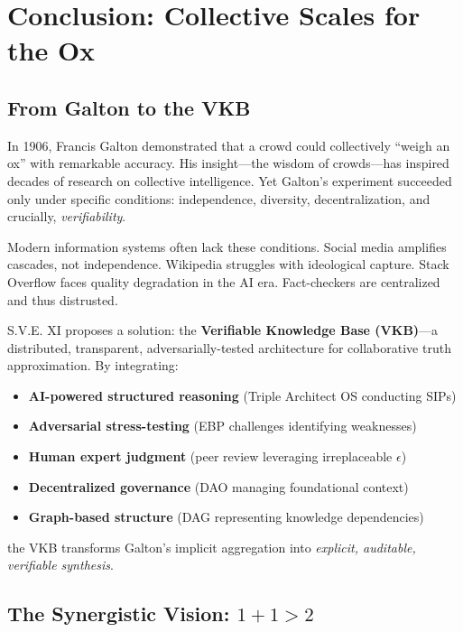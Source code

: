 \documentclass[11pt,a4paper]{article}
\theoremstyle{definition}
\theoremstyle{remark}
\newcommand{\VKB}{\textsc{VKB}}
\newcommand{\SIP}{\textsc{SIP}}
\newcommand{\EBP}{\textsc{EBP}}
\newcommand{\DAO}{\textsc{DAO}}
\begin{document}
\section{Conclusion: Collective Scales for the Ox}

\subsection{From Galton to the VKB}

In 1906, Francis Galton demonstrated that a crowd could collectively ``weigh an ox'' with remarkable accuracy. His insight—the wisdom of crowds—has inspired decades of research on collective intelligence. Yet Galton's experiment succeeded only under specific conditions: independence, diversity, decentralization, and crucially, \textit{verifiability}.

Modern information systems often lack these conditions. Social media amplifies cascades, not independence. Wikipedia struggles with ideological capture. Stack Overflow faces quality degradation in the AI era. Fact-checkers are centralized and thus distrusted.

S.V.E. XI proposes a solution: the \textbf{Verifiable Knowledge Base (\VKB{})}—a distributed, transparent, adversarially-tested architecture for collaborative truth approximation. By integrating:
\begin{itemize}
    \item \textbf{AI-powered structured reasoning} (Triple Architect OS conducting \SIP{}s)
    \item \textbf{Adversarial stress-testing} (\EBP{} challenges identifying weaknesses)
    \item \textbf{Human expert judgment} (peer review leveraging irreplaceable $\epsilon$)
    \item \textbf{Decentralized governance} (\DAO{} managing foundational context)
    \item \textbf{Graph-based structure} (DAG representing knowledge dependencies)
\end{itemize}
the \VKB{} transforms Galton's implicit aggregation into \textit{explicit, auditable, verifiable synthesis}.

\subsection{The Synergistic Vision: $1+1>2$}
\end{document}
